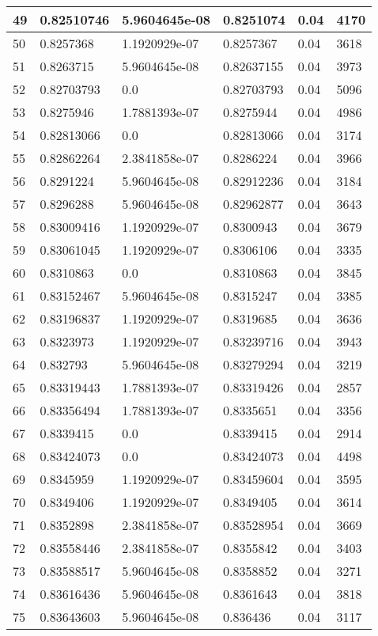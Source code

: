 \begin{longtable}{|l|l|l|l|l|l|}
49 & 0.82510746 & 5.9604645e-08 & 0.8251074 & 0.04 & 4170 \\ \hline 
50 & 0.8257368 & 1.1920929e-07 & 0.8257367 & 0.04 & 3618 \\ \hline 
51 & 0.8263715 & 5.9604645e-08 & 0.82637155 & 0.04 & 3973 \\ \hline 
52 & 0.82703793 & 0.0 & 0.82703793 & 0.04 & 5096 \\ \hline 
53 & 0.8275946 & 1.7881393e-07 & 0.8275944 & 0.04 & 4986 \\ \hline 
54 & 0.82813066 & 0.0 & 0.82813066 & 0.04 & 3174 \\ \hline 
55 & 0.82862264 & 2.3841858e-07 & 0.8286224 & 0.04 & 3966 \\ \hline 
56 & 0.8291224 & 5.9604645e-08 & 0.82912236 & 0.04 & 3184 \\ \hline 
57 & 0.8296288 & 5.9604645e-08 & 0.82962877 & 0.04 & 3643 \\ \hline 
58 & 0.83009416 & 1.1920929e-07 & 0.8300943 & 0.04 & 3679 \\ \hline 
59 & 0.83061045 & 1.1920929e-07 & 0.8306106 & 0.04 & 3335 \\ \hline 
60 & 0.8310863 & 0.0 & 0.8310863 & 0.04 & 3845 \\ \hline 
61 & 0.83152467 & 5.9604645e-08 & 0.8315247 & 0.04 & 3385 \\ \hline 
62 & 0.83196837 & 1.1920929e-07 & 0.8319685 & 0.04 & 3636 \\ \hline 
63 & 0.8323973 & 1.1920929e-07 & 0.83239716 & 0.04 & 3943 \\ \hline 
64 & 0.832793 & 5.9604645e-08 & 0.83279294 & 0.04 & 3219 \\ \hline 
65 & 0.83319443 & 1.7881393e-07 & 0.83319426 & 0.04 & 2857 \\ \hline 
66 & 0.83356494 & 1.7881393e-07 & 0.8335651 & 0.04 & 3356 \\ \hline 
67 & 0.8339415 & 0.0 & 0.8339415 & 0.04 & 2914 \\ \hline 
68 & 0.83424073 & 0.0 & 0.83424073 & 0.04 & 4498 \\ \hline 
69 & 0.8345959 & 1.1920929e-07 & 0.83459604 & 0.04 & 3595 \\ \hline 
70 & 0.8349406 & 1.1920929e-07 & 0.8349405 & 0.04 & 3614 \\ \hline 
71 & 0.8352898 & 2.3841858e-07 & 0.83528954 & 0.04 & 3669 \\ \hline 
72 & 0.83558446 & 2.3841858e-07 & 0.8355842 & 0.04 & 3403 \\ \hline 
73 & 0.83588517 & 5.9604645e-08 & 0.8358852 & 0.04 & 3271 \\ \hline 
74 & 0.83616436 & 5.9604645e-08 & 0.8361643 & 0.04 & 3818 \\ \hline 
75 & 0.83643603 & 5.9604645e-08 & 0.836436 & 0.04 & 3117 \\ \hline 
\end{longtable}